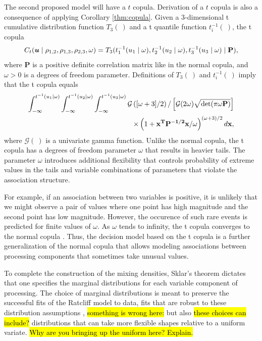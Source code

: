 \documentclass[12pt]{article}
\newcommand{\trish}[1]{\textrm{\hl{#1}}}
\begin{document}
The second proposed model will have a $t$ copula. Derivation of a $t$ copula is also a consequence of applying Corollary \ref{thm:copula}. Given a 3-dimensional t cumulative distribution function $T_3(\:)$ and a t quantile function $t_i^{-1}(\:)$, the t copula 
%
\begin{eqnarray}
C_t(\boldsymbol{u} \mid \rho_{1,2},\rho_{1,3},\rho_{2,3},\omega) = T_3( t_1^{-1}(u_1 \mid \omega),
           t_2^{-1}(u_2 \mid \omega),
           t_3^{-1}(u_3 \mid \omega) \mid \bf{P}), 
\end{eqnarray}
where $\boldsymbol{P}$ is a positive definite correlation matrix like in the normal copula, and $\omega > 0$ is a degrees of freedom parameter.
Definitions of $T_3(\:)$ and $t_i^{-1}(\:)$ imply that the t copula equals
\begin{eqnarray}
\int_{-\infty}^{t^{-1}(u_1 \mid \omega)}
       \int_{-\infty}^{t^{-1}(u_2 \mid \omega)}
       \int_{-\infty}^{t^{-1}(u_3 \mid \omega)}
       \mathcal{G} \left([\omega+3] / 2\right) / \left[\mathcal{G}(2\omega)\sqrt{\det  (\pi\omega\bf{P})}\right]  \nonumber \\  
\times \left( 1 +        \bf{x}^T\bf{P}^{-1 / 2}\bf{x} /
{\omega} \right)^{(\omega + 3) / 2}d\bf{x},
\end{eqnarray}
%
where $\mathcal{G}(\:)$ is a univariate gamma function. 
Unlike the normal copula, the t copula has a degrees of freedom parameter $\omega$ that results in heavier tails. The parameter $\omega$ introduces
additional flexibility that controls probability of
extreme values in the tails and variable combinations of parameters
that violate the association structure. 

For example, if an association
between two variables is positive, it is unlikely that we
might observe a pair of values where one point has high magnitude and
the second point has low magnitude. However, the occurence of
such rare events is predicted for finite values of
$\omega$. As $\omega$ tends to infinity, the t copula
converges to the normal copula \citep{Joe1997}. Thus, the decision  model based on the t copula is a further generalization of the normal copula that allows modeling associations between processing components that sometimes take unusual values.

To complete the construction of the mixing densities, Sklar's theorem
dictates that one specifies the marginal distributions for each
variable component of processing. The choice of marginal distributions
is meant to preserve the successful fits of the
Ratcliff model to data, fits that are robust to
these distribution assumptions \citet{Rat2013},
\trish{something is wrong here:} but also \trish{these choices can
include?}  distributions that can take more flexible shapes relative
to a uniform variate. \trish{Why are you bringing up the uniform
here?  Explain.}
\end{document}
